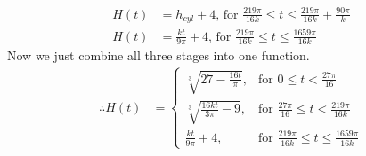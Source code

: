 \documentclass[12pt, a4 paper]{article}
\begin{document}
\begin{outline}[enumerate]
\begin{answer}
   \begin{align*}
     H(t) &= h_{cyl} + 4 \textrm{, for }\frac{219\pi}{16k} \leq t \leq \frac{219\pi}{16k} + \frac{90\pi}{k}\\
     H(t) &= \frac{kt}{9\pi}+4 \textrm{, for }\frac{219\pi}{16k} \leq t \leq \frac{1659\pi}{16k}
   \end{align*}
   Now we just combine all three stages into one function.
   \begin{align*}
     \therefore H(t) &=
        \begin{cases}
          \sqrt[3]{27-\frac{16t}{\pi}}, &\textrm{for }  0 \leq t < \frac{27\pi}{16} \\
          \sqrt[3]{\frac{16kt}{3\pi}-9}, &\textrm{for } \frac{27\pi}{16} \leq t < \frac{219\pi}{16k} \\
          \frac{kt}{9\pi}+4, &\textrm{for } \frac{219\pi}{16k} \leq t \leq \frac{1659\pi}{16k}
        \end{cases}
   \end{align*}
 \end{answer}


\end{outline}
\end{document}
